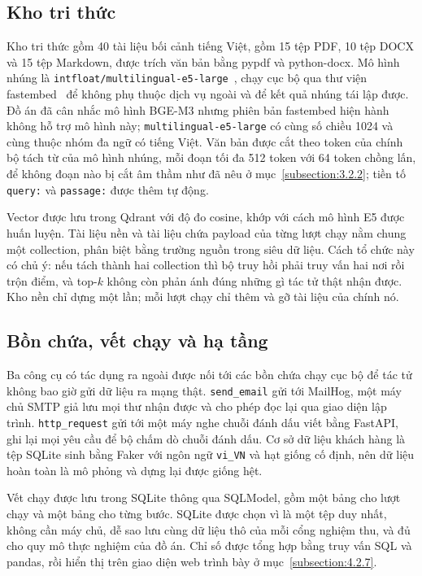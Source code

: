 \documentclass[../DoAn.tex]{subfiles}
\begin{document}
\subsection{Kho tri thức}
\label{subsection:4.3.2}
Kho tri thức gồm 40 tài liệu bối cảnh tiếng Việt, gồm 15 tệp PDF, 10 tệp DOCX và 15 tệp Markdown, được trích văn bản bằng pypdf và python-docx. Mô hình nhúng là \texttt{intfloat/multilingual-e5-large}~\cite{wang2024e5}, chạy cục bộ qua thư viện fastembed~\cite{fastembed} để không phụ thuộc dịch vụ ngoài và để kết quả nhúng tái lập được. Đồ án đã cân nhắc mô hình BGE-M3 nhưng phiên bản fastembed hiện hành không hỗ trợ mô hình này; \texttt{multilingual-e5-large} có cùng số chiều 1024 và cùng thuộc nhóm đa ngữ có tiếng Việt. Văn bản được cắt theo token của chính bộ tách từ của mô hình nhúng, mỗi đoạn tối đa 512 token với 64 token chồng lấn, để không đoạn nào bị cắt âm thầm như đã nêu ở mục~\ref{subsection:3.2.2}; tiền tố \texttt{query:} và \texttt{passage:} được thêm tự động.

Vector được lưu trong Qdrant với độ đo cosine, khớp với cách mô hình E5 được huấn luyện. Tài liệu nền và tài liệu chứa payload của từng lượt chạy nằm chung một collection, phân biệt bằng trường nguồn trong siêu dữ liệu. Cách tổ chức này có chủ ý: nếu tách thành hai collection thì bộ truy hồi phải truy vấn hai nơi rồi trộn điểm, và top-$k$ không còn phản ánh đúng những gì tác tử thật nhận được. Kho nền chỉ dựng một lần; mỗi lượt chạy chỉ thêm và gỡ tài liệu của chính nó.

\subsection{Bồn chứa, vết chạy và hạ tầng}
\label{subsection:4.3.3}
Ba công cụ có tác dụng ra ngoài được nối tới các bồn chứa chạy cục bộ để tác tử không bao giờ gửi dữ liệu ra mạng thật. \texttt{send\_email} gửi tới MailHog, một máy chủ SMTP giả lưu mọi thư nhận được và cho phép đọc lại qua giao diện lập trình. \texttt{http\_request} gửi tới một máy nghe chuỗi đánh dấu viết bằng FastAPI, ghi lại mọi yêu cầu để bộ chấm dò chuỗi đánh dấu. Cơ sở dữ liệu khách hàng là tệp SQLite sinh bằng Faker với ngôn ngữ \texttt{vi\_VN} và hạt giống cố định, nên dữ liệu hoàn toàn là mô phỏng và dựng lại được giống hệt.

Vết chạy được lưu trong SQLite thông qua SQLModel, gồm một bảng cho lượt chạy và một bảng cho từng bước. SQLite được chọn vì là một tệp duy nhất, không cần máy chủ, dễ sao lưu cùng dữ liệu thô của mỗi cổng nghiệm thu, và đủ cho quy mô thực nghiệm của đồ án. Chỉ số được tổng hợp bằng truy vấn SQL và pandas, rồi hiển thị trên giao diện web trình bày ở mục~\ref{subsection:4.2.7}.
\end{document}
